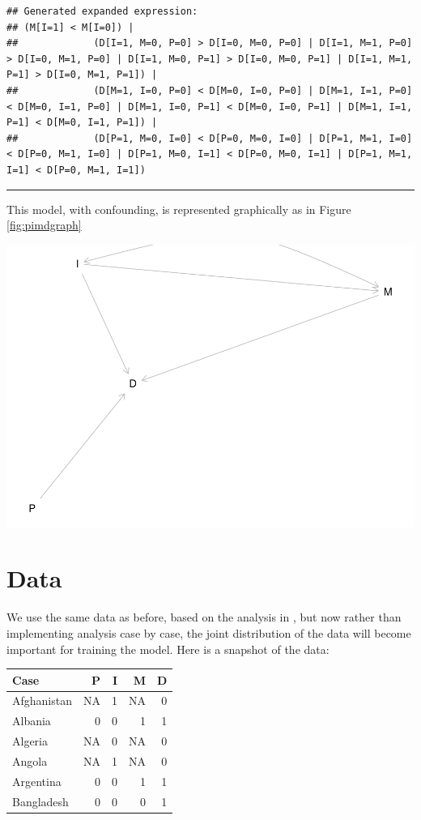 \documentclass[12pt,]{book}
\begin{document}
\begin{verbatim}
## Generated expanded expression:
## (M[I=1] < M[I=0]) |
##             (D[I=1, M=0, P=0] > D[I=0, M=0, P=0] | D[I=1, M=1, P=0] > D[I=0, M=1, P=0] | D[I=1, M=0, P=1] > D[I=0, M=0, P=1] | D[I=1, M=1, P=1] > D[I=0, M=1, P=1]) |
##             (D[M=1, I=0, P=0] < D[M=0, I=0, P=0] | D[M=1, I=1, P=0] < D[M=0, I=1, P=0] | D[M=1, I=0, P=1] < D[M=0, I=0, P=1] | D[M=1, I=1, P=1] < D[M=0, I=1, P=1]) | 
##             (D[P=1, M=0, I=0] < D[P=0, M=0, I=0] | D[P=1, M=1, I=0] < D[P=0, M=1, I=0] | D[P=1, M=0, I=1] < D[P=0, M=0, I=1] | D[P=1, M=1, I=1] < D[P=0, M=1, I=1])
\end{verbatim}

\begin{center}\rule{0.5\linewidth}{\linethickness}\end{center}

This model, with confounding, is represented graphically as in Figure \ref{fig:pimdgraph}

\includegraphics{ii_files/figure-latex/pimdgraph-1.pdf}

\hypertarget{data}{%
\section{Data}\label{data}}

We use the same data as before, based on the analysis in \citet{haggard2012inequality}, but now rather than implementing analysis case by case, the joint distribution of the data will become important for training the model. Here is a snapshot of the data:

\begin{tabular}{l|r|r|r|r}
\hline
Case & P & I & M & D\\
\hline
Afghanistan & NA & 1 & NA & 0\\
\hline
Albania & 0 & 0 & 1 & 1\\
\hline
Algeria & NA & 0 & NA & 0\\
\hline
Angola & NA & 1 & NA & 0\\
\hline
Argentina & 0 & 0 & 1 & 1\\
\hline
Bangladesh & 0 & 0 & 0 & 1\\
\hline
\end{tabular}
\end{document}
